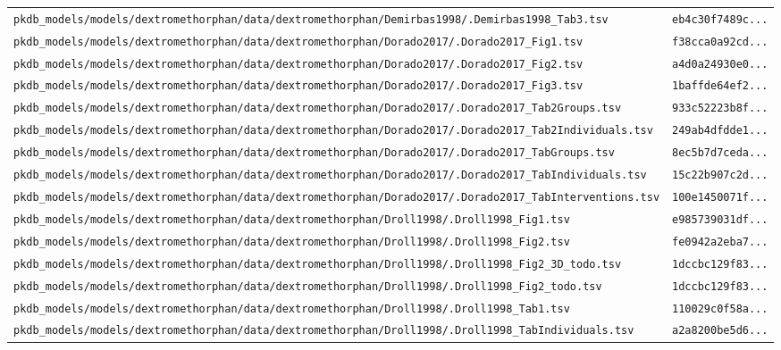 \documentclass{article}
\begin{document}
\begin{longtable}{ll}
\texttt{pkdb\_models/models/dextromethorphan/data/dextromethorphan/Demirbas1998/.Demirbas1998\_Tab3.tsv} & \texttt{eb4c30f7489c...} \\
\texttt{pkdb\_models/models/dextromethorphan/data/dextromethorphan/Dorado2017/.Dorado2017\_Fig1.tsv} & \texttt{f38cca0a92cd...} \\
\texttt{pkdb\_models/models/dextromethorphan/data/dextromethorphan/Dorado2017/.Dorado2017\_Fig2.tsv} & \texttt{a4d0a24930e0...} \\
\texttt{pkdb\_models/models/dextromethorphan/data/dextromethorphan/Dorado2017/.Dorado2017\_Fig3.tsv} & \texttt{1baffde64ef2...} \\
\texttt{pkdb\_models/models/dextromethorphan/data/dextromethorphan/Dorado2017/.Dorado2017\_Tab2Groups.tsv} & \texttt{933c52223b8f...} \\
\texttt{pkdb\_models/models/dextromethorphan/data/dextromethorphan/Dorado2017/.Dorado2017\_Tab2Individuals.tsv} & \texttt{249ab4dfdde1...} \\
\texttt{pkdb\_models/models/dextromethorphan/data/dextromethorphan/Dorado2017/.Dorado2017\_TabGroups.tsv} & \texttt{8ec5b7d7ceda...} \\
\texttt{pkdb\_models/models/dextromethorphan/data/dextromethorphan/Dorado2017/.Dorado2017\_TabIndividuals.tsv} & \texttt{15c22b907c2d...} \\
\texttt{pkdb\_models/models/dextromethorphan/data/dextromethorphan/Dorado2017/.Dorado2017\_TabInterventions.tsv} & \texttt{100e1450071f...} \\
\texttt{pkdb\_models/models/dextromethorphan/data/dextromethorphan/Droll1998/.Droll1998\_Fig1.tsv} & \texttt{e985739031df...} \\
\texttt{pkdb\_models/models/dextromethorphan/data/dextromethorphan/Droll1998/.Droll1998\_Fig2.tsv} & \texttt{fe0942a2eba7...} \\
\texttt{pkdb\_models/models/dextromethorphan/data/dextromethorphan/Droll1998/.Droll1998\_Fig2\_3D\_todo.tsv} & \texttt{1dccbc129f83...} \\
\texttt{pkdb\_models/models/dextromethorphan/data/dextromethorphan/Droll1998/.Droll1998\_Fig2\_todo.tsv} & \texttt{1dccbc129f83...} \\
\texttt{pkdb\_models/models/dextromethorphan/data/dextromethorphan/Droll1998/.Droll1998\_Tab1.tsv} & \texttt{110029c0f58a...} \\
\texttt{pkdb\_models/models/dextromethorphan/data/dextromethorphan/Droll1998/.Droll1998\_TabIndividuals.tsv} & \texttt{a2a8200be5d6...} \\

\end{longtable}
\end{document}

